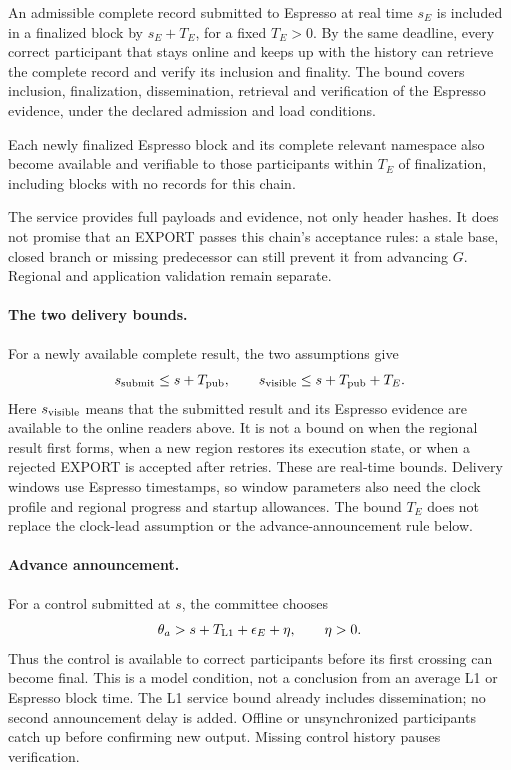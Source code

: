 \begin{assumption}
\label{ass:espresso-visibility}
An admissible complete record submitted to Espresso at real time $s_E$
is included in a finalized block by $s_E+T_E$, for a fixed $T_E>0$.
By the same deadline, every
correct participant that stays online and keeps up with the history can
retrieve the complete record and verify its inclusion and finality.
The bound covers inclusion, finalization, dissemination, retrieval and
verification of the Espresso evidence, under the declared admission and
load conditions.

Each newly finalized Espresso block and its complete relevant namespace
also become available and verifiable to those participants within $T_E$
of finalization, including blocks with no records for this chain.
\end{assumption}
The service provides full payloads and evidence, not only header hashes.
It does not promise that an EXPORT passes this chain's acceptance rules:
a stale base, closed branch or missing predecessor can still prevent it
from advancing $G$. Regional and application validation remain separate.

\paragraph{The two delivery bounds.}
For a newly available complete result, the two assumptions give
\[
 s_{\rm submit}\le s+T_{\rm pub},\qquad
 s_{\rm visible}\le s+T_{\rm pub}+T_E.
\]
Here $s_{\rm visible}$ means that the submitted result and its Espresso
evidence are available to the online readers above. It is not a bound on
when the regional result first forms, when a new region restores its
execution state, or when a rejected EXPORT is accepted after retries.
These are real-time bounds. Delivery windows use Espresso timestamps, so
window parameters also need the clock profile and regional progress and
startup allowances. The bound $T_E$ does not replace the clock-lead
assumption or the advance-announcement rule below.


\paragraph{Advance announcement.}
For a control submitted at $s$, the committee chooses
\[
 \theta_a>s+T_{\rm L1}+\epsilon_E+\eta,
 \qquad \eta>0.
\]
Thus the control is available to correct participants before its
first crossing can become final. This is a model condition, not a
conclusion from an average L1 or Espresso block time. The L1 service
bound already includes dissemination; no second announcement delay is
added. Offline or unsynchronized participants catch up before confirming
new output. Missing control history pauses verification.

